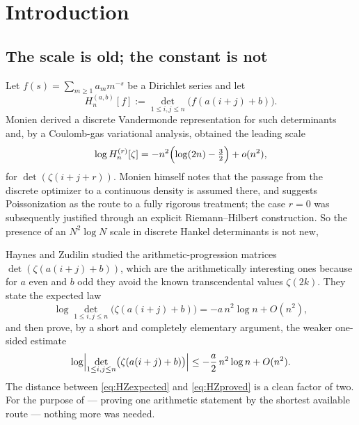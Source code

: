 \documentclass[11pt]{amsart}
\numberwithin{equation}{section}
\theoremstyle{plain}
\theoremstyle{definition}
\theoremstyle{remark}
\begin{document}
\maketitle

\section{Introduction}

\subsection{The scale is old; the constant is not}

Let $f(s)=\sum_{m\ge1}a_{m}m^{-s}$ be a Dirichlet series and let
\[
H_{n}^{(a,b)}[f]:=\det_{1\le i,j\le n}\bigl(f(a(i+j)+b)\bigr).
\]
Monien \cite{Monien2009} derived a discrete Vandermonde representation for such determinants and,
by a Coulomb-gas variational analysis, obtained the leading scale
\begin{equation}
\log H_{n}^{(r)}[\zeta]=-n^{2}\Bigl(\log (2n)-\tfrac32\Bigr)+o(n^{2}),
\label{eq:monien}
\end{equation}
for $\det(\zeta(i+j+r))$. Monien himself notes that the passage from the discrete optimizer to a
continuous density is assumed there, and suggests Poissonization as the route to a fully rigorous
treatment; the case $r=0$ was subsequently justified through an explicit Riemann--Hilbert
construction. So the presence of an $N^{2}\log N$ scale in discrete Hankel determinants is not new,

Haynes and Zudilin \cite{HaynesZudilin2015} studied the arithmetic-progression matrices
$\det(\zeta(a(i+j)+b))$, which are the arithmetically interesting ones because for $a$ even and $b$
odd they avoid the known transcendental values $\zeta(2k)$. They state the expected law
\begin{equation}
\log\det_{1\le i,j\le n}\bigl(\zeta(a(i+j)+b)\bigr)=-a\,n^{2}\log n+O(n^{2}),
\label{eq:HZexpected}
\end{equation}
and then prove, by a short and completely elementary argument, the weaker one-sided estimate
\begin{equation}
\log\Bigl|\det_{1\le i,j\le n}\bigl(\zeta(a(i+j)+b)\bigr)\Bigr|\le-\frac a2\,n^{2}\log n+O(n^{2}).
\label{eq:HZproved}
\end{equation}
The distance between \eqref{eq:HZexpected} and \eqref{eq:HZproved} is a clean factor of two. For
the purpose of \cite{HaynesZudilin2015} --- proving one arithmetic statement by the shortest
available route --- nothing more was needed.
\end{document}
